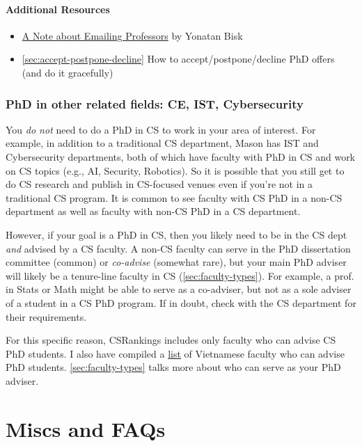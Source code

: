 \documentclass[oneside,11pt,dvipsnames]{book}
\begin{document}
\subsubsection*{Additional Resources}
\begin{itemize}
  \item \href{https://yonatanbisk.com/emailing_professors.html}{A Note about Emailing Professors} by Yonatan Bisk
  \item \autoref{sec:accept-postpone-decline} How to accept/postpone/decline PhD offers (and do it gracefully)
\end{itemize}

\subsection{PhD in other related fields: CE, IST, Cybersecurity}\label{sec:related-fields}

You \emph{do not} need to do a PhD in CS to work in your area of interest. For example, in addition to a traditional CS department, Mason has IST and Cybersecurity departments, both of which have faculty with PhD in CS and work on CS topics (e.g., AI, Security, Robotics).  So it is possible that you still get to do CS research and publish in CS-focused venues even if you're not in a traditional CS program.  It is common to see faculty with CS PhD in a non-CS department as well as faculty with non-CS PhD in a CS department.

However, if your goal is a PhD in CS, then you likely need to be in the CS dept \emph{and} advised by a CS faculty. A non-CS faculty can serve in the PhD dissertation committee (common) or \emph{co-advise} (somewhat rare), but your main PhD adviser will likely be a tenure-line faculty in CS (\autoref{sec:faculty-types}). 
For example, a prof. in Stats or Math might be able to serve as a co-adviser, but not as a sole adviser of a student in a CS PhD program. 
If in doubt, check with the CS department for their requirements.

For this specific reason,  CSRankings includes only faculty who can advise CS PhD students. I also have compiled a \href{https://github.com/dynaroars/dynaroars.github.io/wiki/Viet-CS-Profs-US}{list} of Vietnamese faculty who can advise PhD students. \autoref{sec:faculty-types} talks more about who can serve as your PhD adviser.


\chapter{Miscs and FAQs}\label{sec:faqs}
\end{document}
